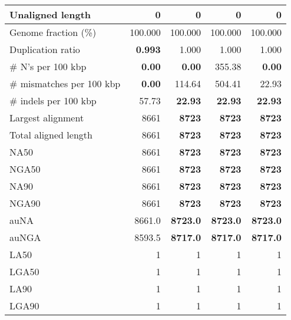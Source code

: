 \documentclass[12pt,a4paper]{article}
\begin{document}
\begin{table}[ht]
\begin{center}
\begin{tabular}{|l*{4}{|r}|}
Unaligned length & 0 & 0 & 0 & 0 \\ \hline
Genome fraction (\%) & 100.000 & 100.000 & 100.000 & 100.000 \\ \hline
Duplication ratio & {\bf 0.993} & 1.000 & 1.000 & 1.000 \\ \hline
\# N's per 100 kbp & {\bf 0.00} & {\bf 0.00} & 355.38 & {\bf 0.00} \\ \hline
\# mismatches per 100 kbp & {\bf 0.00} & 114.64 & 504.41 & 22.93 \\ \hline
\# indels per 100 kbp & 57.73 & {\bf 22.93} & {\bf 22.93} & {\bf 22.93} \\ \hline
Largest alignment & 8661 & {\bf 8723} & {\bf 8723} & {\bf 8723} \\ \hline
Total aligned length & 8661 & {\bf 8723} & {\bf 8723} & {\bf 8723} \\ \hline
NA50 & 8661 & {\bf 8723} & {\bf 8723} & {\bf 8723} \\ \hline
NGA50 & 8661 & {\bf 8723} & {\bf 8723} & {\bf 8723} \\ \hline
NA90 & 8661 & {\bf 8723} & {\bf 8723} & {\bf 8723} \\ \hline
NGA90 & 8661 & {\bf 8723} & {\bf 8723} & {\bf 8723} \\ \hline
auNA & 8661.0 & {\bf 8723.0} & {\bf 8723.0} & {\bf 8723.0} \\ \hline
auNGA & 8593.5 & {\bf 8717.0} & {\bf 8717.0} & {\bf 8717.0} \\ \hline
LA50 & 1 & 1 & 1 & 1 \\ \hline
LGA50 & 1 & 1 & 1 & 1 \\ \hline
LA90 & 1 & 1 & 1 & 1 \\ \hline
LGA90 & 1 & 1 & 1 & 1 \\ \hline
\end{tabular}
\end{center}
\end{table}
\end{document}
